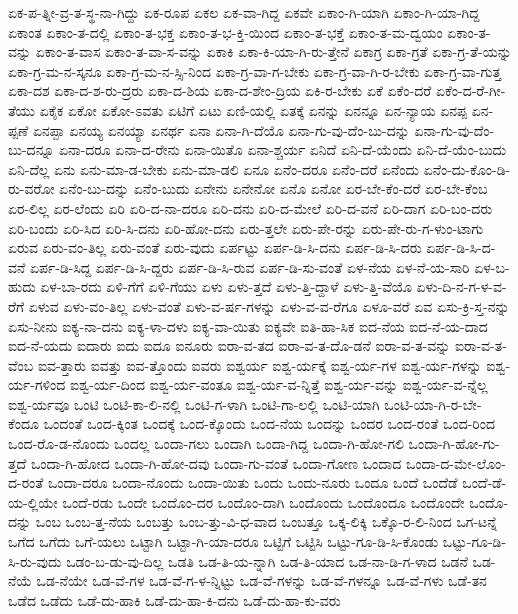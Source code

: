 {ಏಕ-ಪ-ತ್ನೀ-ವ್ರ-ತ-ಸ್ಥ-ನಾ-ಗಿದ್ದು
ಏಕ-ರೂಪ
ಏಕಲ
ಏಕ-ವಾ-ಗಿದ್ದ
ಏಕವೇ
ಏಕಾಂ-ಗಿ-ಯಾಗಿ
ಏಕಾಂ-ಗಿ-ಯಾ-ಗಿದ್ದ
ಏಕಾಂತ
ಏಕಾಂ-ತ-ದಲ್ಲಿ
ಏಕಾಂ-ತ-ಭಕ್ತ
ಏಕಾಂ-ತ-ಭ-ಕ್ತಿ-ಯಿಂದ
ಏಕಾಂ-ತ-ಭಕ್ತೆ
ಏಕಾಂ-ತ-ಮ-ದ್ವಯಂ
ಏಕಾಂ-ತ-ವನ್ನು
ಏಕಾಂ-ತ-ವಾಸ
ಏಕಾಂ-ತ-ವಾ-ಸ-ವನ್ನು
ಏಕಾಕಿ
ಏಕಾ-ಕಿ-ಯಾ-ಗಿ-ರು-ತ್ತೇನೆ
ಏಕಾಗ್ರ
ಏಕಾ-ಗ್ರತೆ
ಏಕಾ-ಗ್ರ-ತೆ-ಯನ್ನು
ಏಕಾ-ಗ್ರ-ಮ-ನ-ಸ್ಕನೂ
ಏಕಾ-ಗ್ರ-ಮ-ನ-ಸ್ಸಿ-ನಿಂದ
ಏಕಾ-ಗ್ರ-ವಾ-ಗ-ಬೇಕು
ಏಕಾ-ಗ್ರ-ವಾ-ಗಿ-ರ-ಬೇಕು
ಏಕಾ-ಗ್ರ-ವಾ-ಗುತ್ತ
ಏಕಾ-ದಶ
ಏಕಾ-ದ-ಶ-ರು-ದ್ರರು
ಏಕಾ-ದ-ಶಿಯ
ಏಕಾ-ದ-ಶೇಂ-ದ್ರಿಯ
ಏಕಿ-ರ-ಬೇಕು
ಏಕೆ
ಏಕೆಂ-ದರೆ
ಏಕೆಂ-ದ-ರೆ-ಗೀ-ತೆಯು
ಏಕೈಕ
ಏಕೋ
ಏಕೋ-ಽವತು
ಏಟಿಗೆ
ಏಟು
ಏಣಿ-ಯಲ್ಲಿ
ಏತಕ್ಕೆ
ಏನನ್ನು
ಏನನ್ನೂ
ಏನ-ನ್ಯಾಯ
ಏನಪ್ಪ
ಏನ-ಪ್ಪಣೆ
ಏನಪ್ಪಾ
ಏನಯ್ಯ
ಏನಯ್ಯಾ
ಏನರ್ಥ
ಏನಾ
ಏನಾ-ಗಿ-ದೆಯೊ
ಏನಾ-ಗು-ವು-ದೆಂ-ಬು-ದನ್ನು
ಏನಾ-ಗು-ವು-ದೆಂ-ಬು-ದನ್ನೂ
ಏನಾ-ದರೂ
ಏನಾ-ದ-ರೇನು
ಏನಾ-ಯಿತೊ
ಏನಾ-ಶ್ಚರ್ಯ
ಏನಿದೆ
ಏನಿ-ದೆ-ಯೆಂದು
ಏನಿ-ದೆ-ಯೆಂ-ಬುದು
ಏನಿ-ದೆಲ್ಲ
ಏನು
ಏನು-ಮಾ-ಡ-ಬೇಕು
ಏನು-ಮಾ-ಡಲಿ
ಏನೂ
ಏನೆಂ-ದರೂ
ಏನೆಂ-ದರೆ
ಏನೆಂದು
ಏನೆಂ-ದು-ಕೊಂ-ಡಿ-ರು-ವರೋ
ಏನೆಂ-ಬು-ದನ್ನು
ಏನೆಂ-ಬುದು
ಏನೇನು
ಏನೇನೋ
ಏನೊ
ಏನೋ
ಏರ-ಬೇ-ಕೆಂ-ದರೆ
ಏರ-ಬೇ-ಕೆಂಬ
ಏರ-ಲಿಲ್ಲ
ಏರ-ಲೆಂದು
ಏರಿ
ಏರಿ-ದ-ನಾ-ದರೂ
ಏರಿ-ದನು
ಏರಿ-ದ-ಮೇಲೆ
ಏರಿ-ದ-ವನೆ
ಏರಿ-ದಾಗ
ಏರಿ-ಬಂ-ದರು
ಏರಿ-ಬಂದು
ಏರಿ-ಸಿದ
ಏರಿ-ಸಿ-ದನು
ಏರಿ-ಹೋ-ದನು
ಏರು-ತ್ತಲೇ
ಏರು-ಪೇ-ರನ್ನು
ಏರು-ಪೇ-ರು-ಗ-ಳುಂ-ಟಾಗು
ಏರುವ
ಏರು-ವಂ-ತಿಲ್ಲ
ಏರು-ವಂತೆ
ಏರು-ವುದು
ಏರ್ಪಟ್ಟು
ಏರ್ಪ-ಡಿ-ಸಿ-ದನು
ಏರ್ಪ-ಡಿ-ಸಿ-ದರು
ಏರ್ಪ-ಡಿ-ಸಿ-ದ-ವನೆ
ಏರ್ಪ-ಡಿ-ಸಿದ್ದ
ಏರ್ಪ-ಡಿ-ಸಿ-ದ್ದರು
ಏರ್ಪ-ಡಿ-ಸಿ-ರುವ
ಏರ್ಪ-ಡಿ-ಸು-ವಂತೆ
ಏಳ-ನೆಯ
ಏಳ-ನೆ-ಯ-ಸಾರಿ
ಏಳ-ಬ-ಹುದು
ಏಳ-ಬಾ-ರದು
ಏಳಿ-ಗೆಗೆ
ಏಳಿ-ಗೆಯು
ಏಳು
ಏಳು-ತ್ತದೆ
ಏಳು-ತ್ತಿ-ದ್ದಾಳೆ
ಏಳು-ತ್ತಿ-ವೆಯೊ
ಏಳು-ದಿ-ನ-ಗ-ಳ-ವ-ರೆಗೆ
ಏಳುವ
ಏಳು-ವಂ-ತಿಲ್ಲ
ಏಳು-ವಂತೆ
ಏಳು-ವ-ರ್ಷ-ಗಳನ್ನು
ಏಳು-ವ-ವ-ರೆಗೂ
ಏಳೂ-ವರೆ
ಏವ
ಏಸು-ಕ್ರಿ-ಸ್ತ-ನನ್ನು
ಏಸು-ನೀನು
ಐಕ್ಯ-ನಾ-ದನು
ಐಕ್ಯ-ಳಾ-ದಳು
ಐಕ್ಯ-ವಾ-ಯಿತು
ಐಕ್ಯವೇ
ಐತಿ-ಹಾ-ಸಿಕ
ಐದ-ನೆಯ
ಐದ-ನೆ-ಯ-ದಾದ
ಐದ-ನೆ-ಯದು
ಐದಾರು
ಐದು
ಐದೂ
ಐನೂರು
ಐರಾ-ವ-ತದ
ಐರಾ-ವ-ತ-ದೊ-ಡನೆ
ಐರಾ-ವ-ತ-ವನ್ನು
ಐರಾ-ವ-ತ-ವೆಂಬ
ಐವ-ತ್ತಾರು
ಐವತ್ತು
ಐವ-ತ್ತೊಂದು
ಐವರು
ಐಶ್ವರ್ಯ
ಐಶ್ವ-ರ್ಯಕ್ಕೆ
ಐಶ್ವ-ರ್ಯ-ಗಳ
ಐಶ್ವ-ರ್ಯ-ಗಳನ್ನು
ಐಶ್ವ-ರ್ಯ-ಗಳಿಂದ
ಐಶ್ವ-ರ್ಯ-ದಿಂದ
ಐಶ್ವ-ರ್ಯ-ವಂತೂ
ಐಶ್ವ-ರ್ಯ-ವ-ನ್ನಿತ್ತೆ
ಐಶ್ವ-ರ್ಯ-ವನ್ನು
ಐಶ್ವ-ರ್ಯ-ವ-ನ್ನೆಲ್ಲ
ಐಶ್ವ-ರ್ಯವೂ
ಒಂಟಿ
ಒಂಟಿ-ಕಾ-ಲಿ-ನಲ್ಲಿ
ಒಂಟಿ-ಗ-ಳಾಗಿ
ಒಂಟಿ-ಗಾ-ಲಲ್ಲಿ
ಒಂಟಿ-ಯಾಗಿ
ಒಂಟಿ-ಯಾ-ಗಿ-ರ-ಬೇ-ಕೆಂದೂ
ಒಂದಂತೆ
ಒಂದ-ಕ್ಕಿಂತ
ಒಂದಕ್ಕೆ
ಒಂದ-ಕ್ಕೊಂದು
ಒಂದ-ನೆಯ
ಒಂದನ್ನು
ಒಂದರ
ಒಂದ-ರಂತೆ
ಒಂದ-ರಿಂದ
ಒಂದ-ರೊ-ಡ-ನೊಂದು
ಒಂದಲ್ಲ
ಒಂದಾ-ಗಲು
ಒಂದಾಗಿ
ಒಂದಾ-ಗಿದ್ದ
ಒಂದಾ-ಗಿ-ಹೋ-ಗಲಿ
ಒಂದಾ-ಗಿ-ಹೋ-ಗು-ತ್ತದೆ
ಒಂದಾ-ಗಿ-ಹೋದ
ಒಂದಾ-ಗಿ-ಹೋ-ದವು
ಒಂದಾ-ಗು-ವಂತೆ
ಒಂದಾ-ಗೋಣ
ಒಂದಾದ
ಒಂದಾ-ದ-ಮೇ-ಲೊಂ-ದ-ರಂತೆ
ಒಂದಾ-ದರೂ
ಒಂದಾ-ನೊಂದು
ಒಂದಾ-ಯಿತು
ಒಂದು
ಒಂದು-ನೂರು
ಒಂದೂ
ಒಂದೆ
ಒಂದೆಡೆ
ಒಂದೆ-ಡೆ-ಯ-ಲ್ಲಿಯೇ
ಒಂದೆ-ರಡು
ಒಂದೇ
ಒಂದೊಂ-ದರ
ಒಂದೊಂ-ದಾಗಿ
ಒಂದೊಂದು
ಒಂದೊಂದೂ
ಒಂದೊಂದೇ
ಒಂದೊ-ದನ್ನು
ಒಂಬ
ಒಂಬ-ತ್ತ-ನೆಯ
ಒಂಬತ್ತು
ಒಂಬ-ತ್ತು-ವಿ-ಧ-ವಾದ
ಒಂಬತ್ತೂ
ಒಕ್ಕ-ಲಿಕ್ಕಿ
ಒಕ್ಕೊ-ರ-ಲಿ-ನಿಂದ
ಒಗ-ಟನ್ನೆ
ಒಗೆದ
ಒಗೆದು
ಒಗೆ-ಯಲು
ಒಟ್ಟಾಗಿ
ಒಟ್ಟಾ-ಗಿ-ಯಾ-ದರೂ
ಒಟ್ಟಿಗೆ
ಒಟ್ಟಿಸಿ
ಒಟ್ಟು-ಗೂ-ಡಿ-ಸಿ-ಕೊಂಡು
ಒಟ್ಟು-ಗೂ-ಡಿ-ಸಿ-ರು-ವುದು
ಒಡಂ-ಬ-ಡು-ವು-ದಿಲ್ಲ
ಒಡತಿ
ಒಡ-ತಿ-ಯ-ನ್ನಾಗಿ
ಒಡ-ತಿ-ಯಾದ
ಒಡ-ನಾ-ಡಿ-ಗ-ಳಾದ
ಒಡನೆ
ಒಡ-ನೆಯೆ
ಒಡ-ನೆಯೇ
ಒಡ-ವೆ-ಗಳ
ಒಡ-ವೆ-ಗ-ಳ-ನ್ನಿಟ್ಟು
ಒಡ-ವೆ-ಗಳನ್ನು
ಒಡ-ವೆ-ಗಳನ್ನೂ
ಒಡ-ವೆ-ಗಳು
ಒಡೆ-ತನ
ಒಡೆದ
ಒಡೆದು
ಒಡೆ-ದು-ಹಾಕಿ
ಒಡೆ-ದು-ಹಾ-ಕಿ-ದನು
ಒಡೆ-ದು-ಹಾ-ಕು-ವರು
}
